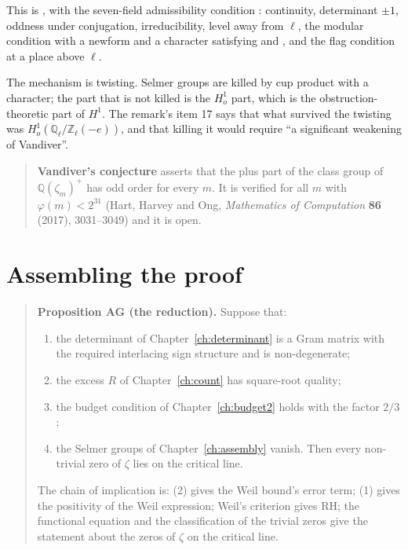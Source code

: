 This is , with the seven-field admissibility condition
: continuity, determinant $\pm 1$, oddness under conjugation,
irreducibility, level away from $\ell$, the modular condition with a newform
and a character satisfying  and , and the flag
condition at a place above $\ell$.

The mechanism is twisting. Selmer groups are killed by cup product with a
character; the part that is not killed is the $H^1_o$ part, which is the
obstruction-theoretic part of $H^1$. The remark's item 17 says that what
survived the twisting was $H^1_o(\mathbb{Q}_\ell/\mathbb{Z}_\ell(-e))$, and
that killing it would require ``a significant weakening of Vandiver''.

\begin{quote}
\textbf{Vandiver's conjecture} asserts that the plus part of the class group of
$\mathbb{Q}(\zeta_m)^+$ has odd order for every $m$. It is verified for all
$m$ with $\varphi(m) < 2^{31}$ (Hart, Harvey and Ong, \emph{Mathematics of
Computation} \textbf{86} (2017), 3031--3049) and it is open.
\end{quote}

\section{Assembling the proof}\begin{quote}
\textbf{Proposition AG (the reduction).} Suppose that:
\begin{enumerate}
\item the determinant of Chapter~\ref{ch:determinant} is a Gram matrix with
the required interlacing sign structure and is non-degenerate;
\item the excess $R$ of Chapter~\ref{ch:count} has square-root quality;
\item the budget condition of Chapter~\ref{ch:budget2} holds with the factor
$2/3$;
\item the Selmer groups of Chapter~\ref{ch:assembly} vanish.
Then every non-trivial zero of $\zeta$ lies on the critical line.
\end{enumerate}

The chain of implication is: (2) gives the Weil bound's error term; (1) gives
the positivity of the Weil expression; Weil's criterion gives RH; the functional
equation and the classification of the trivial zeros give the statement about
the zeros of $\zeta$ on the critical line.
\end{quote}

